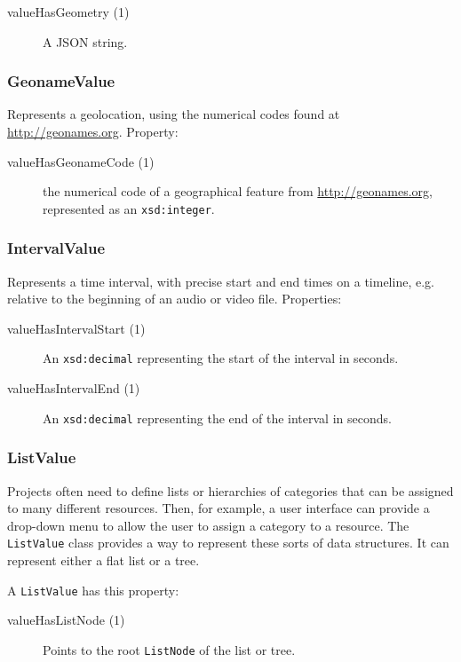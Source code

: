 \documentclass[12pt, a4paper]{article}
\begin{document}
\begin{description}
	\item[valueHasGeometry (1)] A JSON string.
\end{description}

\subsubsection{GeonameValue}

Represents a geolocation, using the numerical codes found at \url{http://geonames.org}. Property:

\begin{description}
	\item[valueHasGeonameCode (1)] the numerical code of a geographical feature from \url{http://geonames.org}, represented as an \texttt{xsd:integer}.
\end{description}

\subsubsection{IntervalValue}

Represents a time interval, with precise start and end times on a timeline, e.g. relative to the beginning of an audio or video file. Properties:

\begin{description}
	\item[valueHasIntervalStart (1)] An \texttt{xsd:decimal} representing the start of the interval in seconds.
	\item[valueHasIntervalEnd (1)]	An \texttt{xsd:decimal} representing the end of the interval in seconds.
\end{description}

\subsubsection{ListValue}

Projects often need to define lists or hierarchies of categories that can be assigned to many different resources. Then, for example, a user interface can provide a drop-down menu to allow the user to assign a category to a resource. The \texttt{ListValue} class provides a way to represent these sorts of data structures. It can represent either a flat list or a tree.

A \texttt{ListValue} has this property:

\begin{description}
	\item[valueHasListNode (1)] Points to the root \texttt{ListNode} of the list or tree.
\end{description}
\end{document}
